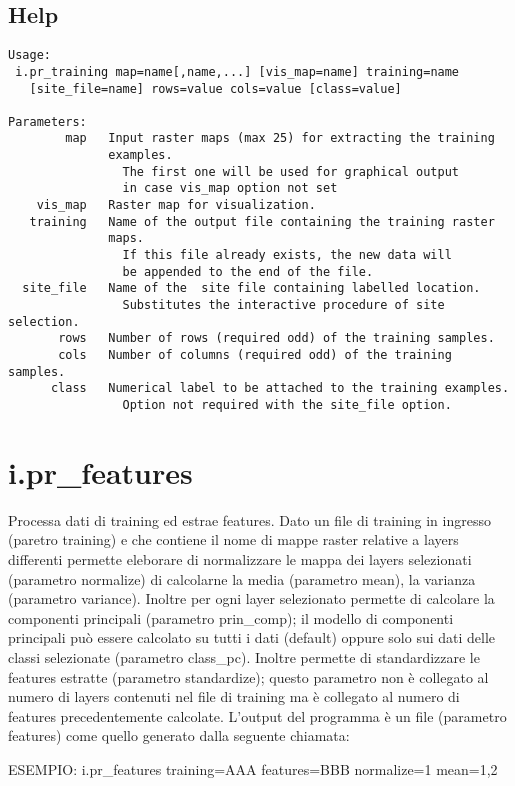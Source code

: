 \subsection*{Help}
\begin{verbatim}
Usage:
 i.pr_training map=name[,name,...] [vis_map=name] training=name
   [site_file=name] rows=value cols=value [class=value]

Parameters:
        map   Input raster maps (max 25) for extracting the training
              examples.
                The first one will be used for graphical output 
                in case vis_map option not set
    vis_map   Raster map for visualization.
   training   Name of the output file containing the training raster 
              maps.
                If this file already exists, the new data will 
                be appended to the end of the file.
  site_file   Name of the  site file containing labelled location.
                Substitutes the interactive procedure of site selection.
       rows   Number of rows (required odd) of the training samples.
       cols   Number of columns (required odd) of the training samples.
      class   Numerical label to be attached to the training examples.
                Option not required with the site_file option.
\end{verbatim}

\section{i.pr\_features}
Processa dati di training ed estrae features. Dato un file di training
in ingresso (paretro training) e che contiene il nome di mappe raster
relative a layers differenti permette eleborare di normalizzare le
mappa dei layers selezionati (parametro normalize) di calcolarne la
media (parametro mean), la varianza (parametro variance). Inoltre per
ogni layer selezionato permette di calcolare la componenti principali
(parametro prin\_comp); il modello di componenti principali pu\`{o}
essere calcolato su tutti i dati (default) oppure solo sui dati delle
classi selezionate (parametro class\_pc). Inoltre permette di
standardizzare le features estratte (parametro standardize); questo
parametro non \`{e} collegato al numero di layers contenuti nel file di
training ma \`{e} collegato al numero di features precedentemente
calcolate. L'output del programma \`{e} un file (parametro features) come quello generato dalla seguente chiamata:

ESEMPIO: i.pr\_features training=AAA features=BBB normalize=1 mean=1,2

